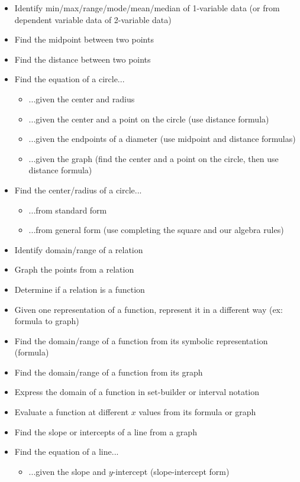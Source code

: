 \documentclass{article}
\begin{document}
\begin{itemize}
    \item Identify min/max/range/mode/mean/median of 1-variable data (or from dependent variable data of 2-variable data)
    \item Find the midpoint between two points
    \item Find the distance between two points
    \item Find the equation of a circle...
    \begin{itemize}
        \item ...given the center and radius
        \item ...given the center and a point on the circle (use distance formula)
        \item ...given the endpoints of a diameter (use midpoint and distance formulas)
        \item ...given the graph (find the center and a point on the circle, then use distance formula)
    \end{itemize}
    \item Find the center/radius of a circle...
    \begin{itemize}
        \item ...from standard form
        \item ...from general form (use completing the square and our algebra rules)
    \end{itemize}
    \item Identify domain/range of a relation
    \item Graph the points from a relation
    \item Determine if a relation is a function
    \item Given one representation of a function, represent it in a different way (ex: formula to graph)
    \item Find the domain/range of a function from its symbolic representation (formula)
    \item Find the domain/range of a function from its graph
    \item Express the domain of a function in set-builder or interval notation
    \item Evaluate a function at different $x$ values from its formula or graph
    \item Find the slope or intercepts of a line from a graph
    \item Find the equation of a line... 
    \begin{itemize}
        \item ...given the slope and $y$-intercept (slope-intercept form)

\end{itemize}
\end{itemize}
\end{document}
